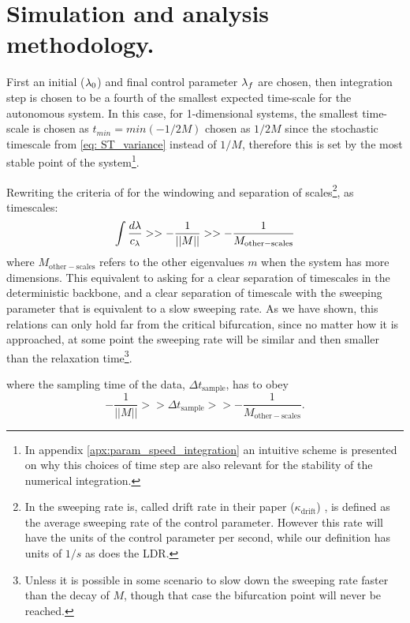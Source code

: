 \section{Simulation and analysis methodology.}

First an initial ($\lambda_0$) and final control parameter $\lambda_f$ are chosen, then integration step is chosen to be a fourth of the smallest expected time-scale for the autonomous system. 
In this case, for 1-dimensional systems, the smallest time-scale is chosen as $t_{min}=min (-1/2M)$ chosen as $1/2M$ since the stochastic timescale from \cref{eq: ST_variance}  instead of $1/M$, therefore this is set by the most stable point of the system\footnote{In appendix \ref{apx:param_speed_integration} an intuitive scheme is presented on why this choices of time step are also relevant for the stability of the numerical integration.}. 

Rewriting the criteria of \cite{Thompson2011a} for the windowing  and separation of scales\footnote{In \cite{Thompson2011a} the sweeping rate is, called drift rate in their paper ($\kappa_{\mathrm{drift}}$) , is defined as the average sweeping rate  of the control parameter. However this rate will have the units of the control parameter per second, while our definition has units of $1/s$ as does the LDR.}, as timescales:
\begin{equation}
	\int \frac{d\lambda}{c_\lambda} >> -\frac{1}{||M||}>> -\frac{1}{M_{\mathrm{other-scales}}}
\end{equation}
where $M_{\mathrm{other-scales}}$ refers to the other eigenvalues $m$ when the system has more dimensions. This equivalent to asking for a clear separation of timescales in the deterministic backbone, and a clear separation of timescale with the sweeping parameter that is equivalent to a slow sweeping rate. 
As we have shown, this relations can only hold far from the critical bifurcation, since no matter how it is approached, at some point the sweeping rate will be similar and then smaller than the relaxation time\footnote{Unless it is possible in some scenario to slow down the sweeping rate faster than the decay of $M$, though that case the bifurcation point will never be reached.}. 	
	
where the sampling time of the data, $\Delta t_{\mathrm{sample}}$, has to obey
\begin{equation}
	-\frac{1}{||M||} >> \Delta t_{\mathrm{sample}} >> -\frac{1}{M_{\mathrm{other-scales}}}.
\end{equation}



